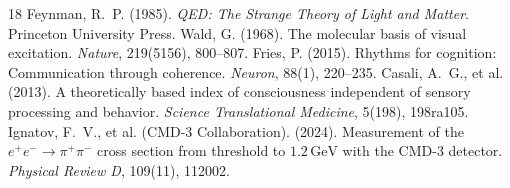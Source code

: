 \documentclass[11pt,a4paper]{article}
\begin{document}
\begin{thebibliography}{18}
 Feynman, R.~P. (1985). \emph{QED: The Strange Theory of Light and Matter}. Princeton University Press.
 Wald, G. (1968). The molecular basis of visual excitation. \emph{Nature}, 219(5156), 800--807.
 Fries, P. (2015). Rhythms for cognition: Communication through coherence. \emph{Neuron}, 88(1), 220--235.
 Casali, A.~G., et al. (2013). A theoretically based index of consciousness independent of sensory processing and behavior. \emph{Science Translational Medicine}, 5(198), 198ra105.
 Ignatov, F.~V., et al. (CMD-3 Collaboration). (2024). Measurement of the $e^+e^- \to \pi^+\pi^-$ cross section from threshold to $1.2\,\mathrm{GeV}$ with the CMD-3 detector. \emph{Physical Review D}, 109(11), 112002.
\end{thebibliography}
\end{document}
